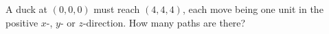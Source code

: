 A duck at $(0,0,0)$ must reach $(4,4,4)$, each move being one unit in the positive $x$-, $y$- or $z$-direction. How many paths are there?

